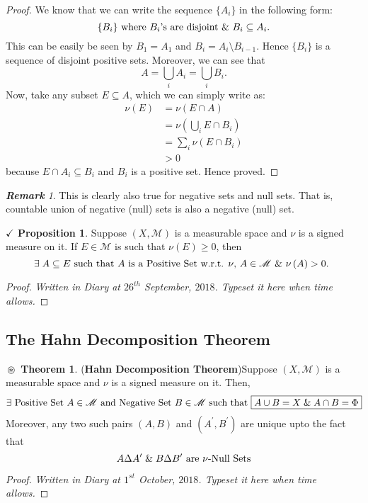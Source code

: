\documentclass{article}
\theoremstyle{definition}
\newtheorem{theorem}{$\boxed{\boxed{\circledast}}$ Theorem}
\theoremstyle{remark}
\newtheorem*{remark}{\textbf{Remark}}
\theoremstyle{definition}
\theoremstyle{definition}
\newtheorem{proposition}{$\checkmark$ Proposition}
\theoremstyle{definition}
\newcommand{\union}{\cup}
\newcommand{\intrs}{\cap}
\newcommand{\bunion}{\bigcup}
\newcommand{\alg}[1]{\mathscr{#1}}
\newcommand{\sm}[1]{\nu\left (#1\right )}
\begin{document}
\begin{proof}
	We know that we can write the sequence $ \{A_i\} $ in the following form:
	\[\{B_i\}\text{ where $ B_i $'s are disjoint \& $ B_i \subseteq A_i $.}\]
	This can be easily be seen by $ B_1 = A_1$ and $ B_i = A_i \setminus B_{i-1} $. Hence $ \{B_i\} $ is a sequence of disjoint positive sets. Moreover, we can see that
	\[A = \bunion_{i} A_i = \bunion_{i} B_i.\]
	Now, take any subset $ E\subseteq  A $, which we can simply write as:
	\begin{align*}
		\sm{E} &= \sm{E\intrs A} \\
		&= \sm{\bunion_{i} E \intrs B_i}\\
		&= \sum_{i} \sm{E\intrs B_i}\\
		&>0
	\end{align*}
because $ E\intrs A_i\subseteq B_i $ and $ B_i $ is a positive set. Hence proved.
\end{proof}
\begin{remark}
	This is clearly also true for negative sets and null sets. That is, countable union of negative (null) sets is also a negative (null) set.
\end{remark}
\hrulefill
\begin{proposition}
	Suppose $ (X,\alg{M}) $ is a measurable space and $ \nu $ is a signed measure on it. If $ E\in \alg{M} $ is such that $ \sm{E} \ge 0 $, then
	\[\text{$ \exists \;A \subseteq E$ such that $ A $ is a Positive Set w.r.t. $ \nu $, $ A\in \alg{M} $ \& $ \sm{A} > 0 $. }\]
\end{proposition}
\begin{proof}
		\emph{Written in Diary at $ 26^{th} $ September, $ 2018 $. Typeset it here when time allows.}
\end{proof}
\hrulefill
\subsection{The Hahn Decomposition Theorem}
\begin{theorem}(\textbf{Hahn Decomposition Theorem})\label{T-18}
	Suppose $ (X,\alg{M}) $ is a measurable space and $ \nu $ is a signed measure on it. Then, 
	\[\exists \text{ Positive Set $ A \in \alg{M}$ and Negative Set $ B\in \alg{M} $} \text{ such that } \boxed{A\union B = X \;\&\;A\intrs B = \Phi}\]
	Moreover, any two such pairs $ (A,B) $ and $ (A^{\prime},B^{\prime}) $ are unique upto the fact that
	\[A\Delta A^{\prime}\;\&\;B\Delta B^{\prime} \text{ are $ \nu $-Null Sets}\]
	
\end{theorem}
\begin{proof}
		\emph{Written in Diary at $ 1^{st} $ October, $ 2018 $. Typeset it here when time allows.}
\end{proof}
\end{document}
